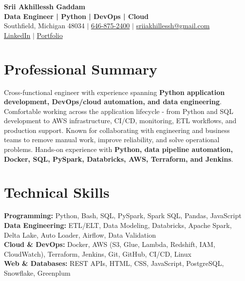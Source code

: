 \documentclass[letterpaper,10pt]{article}
\begin{document}
\fontsize{9.35pt}{10.45pt}\selectfont

\begin{center}
    {\LARGE \textbf{Srii Akhillessh Gaddam}} \\[-1pt]
    \textbf{Data Engineer | Python | DevOps | Cloud} \\[2pt]
    Southfield, Michigan 48034 $|$
    \href{tel:6468752400}{646-875-2400} $|$
    \href{mailto:sriiakhillessh@gmail.com}{sriiakhillessh@gmail.com} \\[1pt]
    \href{https://www.linkedin.com/in/srii-akhiilessh-gaddam-b48668191/}{LinkedIn} $|$
    \href{https://sriiakhillesshg.github.io/portfolio/}{Portfolio}
\end{center}
\vspace{-8pt}

\section{Professional Summary}
\small{Cross-functional engineer with experience spanning \textbf{Python application development, DevOps/cloud automation, and data engineering}. Comfortable working across the application lifecycle - from Python and SQL development to AWS infrastructure, CI/CD, monitoring, ETL workflows, and production support. Known for collaborating with engineering and business teams to remove manual work, improve reliability, and solve operational problems. Hands-on experience with \textbf{Python, data pipeline automation, Docker, SQL, PySpark, Databricks, AWS, Terraform, and Jenkins}.}

\section{Technical Skills}
\small{
\textbf{Programming:} Python, Bash, SQL, PySpark, Spark SQL, Pandas, JavaScript \\
\textbf{Data Engineering:} ETL/ELT, Data Modeling, Databricks, Apache Spark, Delta Lake, Auto Loader, Airflow, Data Validation \\
\textbf{Cloud \& DevOps:} Docker, AWS (S3, Glue, Lambda, Redshift, IAM, CloudWatch), Terraform, Jenkins, Git, GitHub, CI/CD, Linux \\
\textbf{Web \& Databases:} REST APIs, HTML, CSS, JavaScript, PostgreSQL, Snowflake, Greenplum
}

\end{document}
